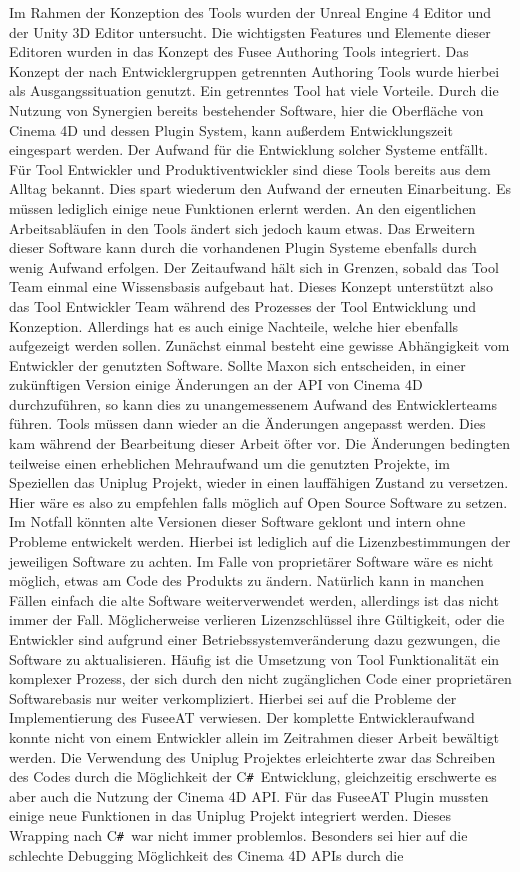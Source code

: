 \documentclass[pagesize, paper=a4, fontsize=12pt, titlepage=true, headings=small, headnosepline, abstractoff, liststotoc, nochapterprefix, plainheadsepline, twoside]{scrreprt}
\newcommand{\CSS}{C\texttt{\# }}
\begin{document}
Im Rahmen der Konzeption des Tools wurden der Unreal Engine 4 Editor und der Unity 3D Editor untersucht. Die wichtigsten Features und Elemente dieser Editoren wurden in das Konzept des Fusee Authoring Tools integriert. Das Konzept der nach Entwicklergruppen getrennten Authoring Tools wurde hierbei als Ausgangssituation genutzt. Ein getrenntes Tool hat viele Vorteile. Durch die Nutzung von Synergien bereits bestehender Software, hier die Oberfläche von Cinema 4D und dessen Plugin System, kann außerdem Entwicklungszeit eingespart werden. Der Aufwand für die Entwicklung solcher Systeme entfällt. Für Tool Entwickler und Produktiventwickler sind diese Tools bereits aus dem Alltag bekannt. Dies spart wiederum den Aufwand der erneuten Einarbeitung. Es müssen lediglich einige neue Funktionen erlernt werden. An den eigentlichen Arbeitsabläufen in den Tools ändert sich jedoch kaum etwas. Das Erweitern dieser Software kann durch die vorhandenen Plugin Systeme ebenfalls durch wenig Aufwand erfolgen. Der Zeitaufwand hält sich in Grenzen, sobald das Tool Team einmal eine Wissensbasis aufgebaut hat. Dieses Konzept unterstützt also das Tool Entwickler Team während des Prozesses der Tool Entwicklung und Konzeption. Allerdings hat es auch einige Nachteile, welche hier ebenfalls aufgezeigt werden sollen. Zunächst einmal besteht eine gewisse Abhängigkeit vom Entwickler der genutzten Software. Sollte Maxon sich entscheiden, in einer zukünftigen Version einige Änderungen an der API von Cinema 4D durchzuführen, so kann dies zu unangemessenem Aufwand des Entwicklerteams führen. Tools müssen dann wieder an die Änderungen angepasst werden. Dies kam während der Bearbeitung dieser Arbeit öfter vor. Die Änderungen bedingten teilweise einen erheblichen Mehraufwand um die genutzten Projekte, im Speziellen das Uniplug Projekt, wieder in einen lauffähigen Zustand zu versetzen. Hier wäre es also zu empfehlen falls möglich auf Open Source Software zu setzen. Im Notfall könnten alte Versionen dieser Software geklont und intern ohne Probleme entwickelt werden. Hierbei ist lediglich auf die Lizenzbestimmungen der jeweiligen Software zu achten. Im Falle von proprietärer Software wäre es nicht möglich, etwas am Code des Produkts zu ändern. Natürlich kann in manchen Fällen einfach die alte Software weiterverwendet werden, allerdings ist das nicht immer der Fall. Möglicherweise verlieren Lizenzschlüssel ihre Gültigkeit, oder die Entwickler sind aufgrund einer Betriebssystemveränderung dazu gezwungen, die Software zu aktualisieren. Häufig ist die Umsetzung von Tool Funktionalität ein komplexer Prozess, der sich durch den nicht zugänglichen Code einer proprietären Softwarebasis nur weiter verkompliziert. Hierbei sei auf die Probleme der Implementierung des FuseeAT verwiesen. Der komplette Entwickleraufwand konnte nicht von einem Entwickler allein im Zeitrahmen dieser Arbeit bewältigt werden. Die Verwendung des Uniplug Projektes erleichterte zwar das Schreiben des Codes durch die Möglichkeit der \CSS Entwicklung, gleichzeitig erschwerte es aber auch die Nutzung der Cinema 4D API. Für das FuseeAT Plugin mussten einige neue Funktionen in das Uniplug Projekt integriert werden. Dieses Wrapping nach \CSS war nicht immer problemlos. Besonders sei hier auf die schlechte Debugging Möglichkeit des Cinema 4D APIs durch die 
\end{document}
